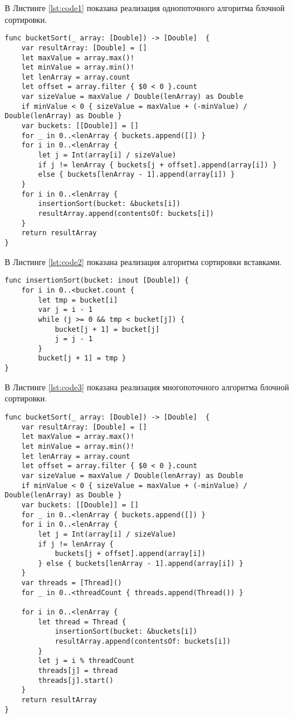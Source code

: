 \hspace{0.6cm}В Листинге \ref{lst:code1} показана реализация однопоточного алгоритма блочной сортировки.
\begin{lstlisting}[label=lst:code1, caption=Функция алгоритма блочной сортировки однопоточная]
func bucketSort(_ array: [Double]) -> [Double]  {
    var resultArray: [Double] = []
    let maxValue = array.max()!
    let minValue = array.min()!
    let lenArray = array.count
    let offset = array.filter { $0 < 0 }.count
    var sizeValue = maxValue / Double(lenArray) as Double
    if minValue < 0 { sizeValue = maxValue + (-minValue) / Double(lenArray) as Double }
    var buckets: [[Double]] = []
    for _ in 0..<lenArray { buckets.append([]) }
    for i in 0..<lenArray {
        let j = Int(array[i] / sizeValue)
        if j != lenArray { buckets[j + offset].append(array[i]) } 
        else { buckets[lenArray - 1].append(array[i]) }
    }
    for i in 0..<lenArray {
        insertionSort(bucket: &buckets[i])
        resultArray.append(contentsOf: buckets[i])
    }
    return resultArray
}
\end{lstlisting}


\hspace{0.6cm}В Листинге \ref{lst:code2} показана реализация алгоритма сортировки вставками.
\begin{lstlisting}[label=lst:code2, caption=Функция алгоритма сортировки вставками]
func insertionSort(bucket: inout [Double]) {
    for i in 0..<bucket.count {
        let tmp = bucket[i]
        var j = i - 1
        while (j >= 0 && tmp < bucket[j]) {
            bucket[j + 1] = bucket[j]
            j = j - 1
        }
        bucket[j + 1] = tmp }
}
\end{lstlisting}

\hspace{0.6cm}В Листинге \ref{lst:code3} показана реализация многопоточного алгоритма блочной сортировки.
\begin{lstlisting}[label=lst:code3, caption=Функция алгоритма блочной сортировки многопоточная]
func bucketSort(_ array: [Double]) -> [Double]  {
    var resultArray: [Double] = []
    let maxValue = array.max()!
    let minValue = array.min()!
    let lenArray = array.count
    let offset = array.filter { $0 < 0 }.count
    var sizeValue = maxValue / Double(lenArray) as Double
    if minValue < 0 { sizeValue = maxValue + (-minValue) / Double(lenArray) as Double }
    var buckets: [[Double]] = []
    for _ in 0..<lenArray { buckets.append([]) }
    for i in 0..<lenArray {
        let j = Int(array[i] / sizeValue)
        if j != lenArray {
            buckets[j + offset].append(array[i])
        } else { buckets[lenArray - 1].append(array[i]) }
    }
    var threads = [Thread]()
    for _ in 0..<threadCount { threads.append(Thread()) }
    
    for i in 0..<lenArray {
        let thread = Thread {
            insertionSort(bucket: &buckets[i])
            resultArray.append(contentsOf: buckets[i])
        }
        let j = i % threadCount
        threads[j] = thread
        threads[j].start()
    }    
    return resultArray
}
\end{lstlisting}

